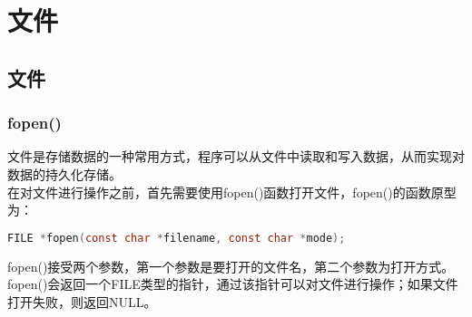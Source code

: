 \chapter{文件}

\section{文件}

\subsection{fopen()}

文件是存储数据的一种常用方式，程序可以从文件中读取和写入数据，从而实现对数据的持久化存储。\\

在对文件进行操作之前，首先需要使用fopen()函数打开文件，fopen()的函数原型为：

\vspace{-0.5cm}

\begin{lstlisting}[language=C]
FILE *fopen(const char *filename, const char *mode);
\end{lstlisting}

fopen()接受两个参数，第一个参数是要打开的文件名，第二个参数为打开方式。fopen()会返回一个FILE类型的指针，通过该指针可以对文件进行操作；如果文件打开失败，则返回NULL。\\

\begin{table}[H]
    \centering
    \caption{文件打开方式}
\end{table}

